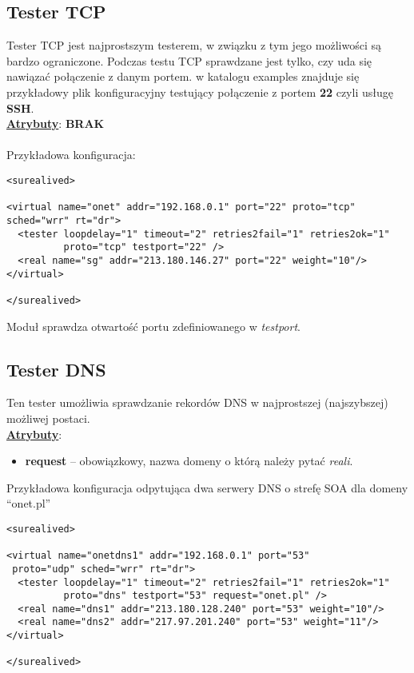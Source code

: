\documentclass[polish,12pt]{article}
\begin{document}
\subsection{Tester TCP}
Tester TCP jest najprostszym testerem, w związku z tym jego możliwości są bardzo ograniczone.
Podczas testu TCP sprawdzane jest tylko, czy uda się nawiązać połączenie z danym portem.
w katalogu examples znajduje się przykładowy plik konfiguracyjny testujący połączenie z portem \textbf{22}
czyli usługę \textbf{SSH}.
\newline
\\\underline{\textbf{Atrybuty}}: \textbf{BRAK}\\
\\Przykładowa konfiguracja:
{\footnotesize
\begin{verbatim}
<surealived>

<virtual name="onet" addr="192.168.0.1" port="22" proto="tcp" sched="wrr" rt="dr">
  <tester loopdelay="1" timeout="2" retries2fail="1" retries2ok="1"
          proto="tcp" testport="22" />
  <real name="sg" addr="213.180.146.27" port="22" weight="10"/>
</virtual>

</surealived>
\end{verbatim}
}
Moduł sprawdza otwartość portu zdefiniowanego w \textit{testport}.

\subsection{Tester DNS}
Ten tester umożliwia sprawdzanie rekordów DNS w najprostszej (najszybszej) możliwej postaci.\newline
\\\underline{\textbf{Atrybuty}}:
\begin{itemize}
  \item \textbf{request} -- obowiązkowy, nazwa domeny o którą należy pytać \textit{reali}.
\end{itemize}
Przykładowa konfiguracja odpytująca dwa serwery DNS o strefę SOA dla domeny ``onet.pl''
{\footnotesize
\begin{verbatim}
<surealived>

<virtual name="onetdns1" addr="192.168.0.1" port="53"
 proto="udp" sched="wrr" rt="dr">
  <tester loopdelay="1" timeout="2" retries2fail="1" retries2ok="1"
          proto="dns" testport="53" request="onet.pl" />
  <real name="dns1" addr="213.180.128.240" port="53" weight="10"/>
  <real name="dns2" addr="217.97.201.240" port="53" weight="11"/>
</virtual>

</surealived>
\end{verbatim}
}
\newpage
\end{document}
